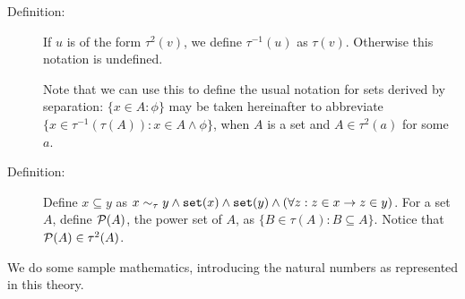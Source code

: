 \documentclass[12pt]{article}
\begin{document}
\begin{description}

\item[Definition:]  If $u$ is of the form $\tau^2(v)$, we define $\tau^{-1}(u)$ as $\tau(v)$.  Otherwise this notation is undefined.

Note that we can use this to define the usual notation for sets derived by separation:  $\{x \in A : \phi\}$
may be taken hereinafter to abbreviate $\{x \in \tau^{-1}(\tau(A)):x \in A \wedge \phi\}$, when $A$ is a set and $A \in \tau^2(a)$ for some $a$.

\item[Definition:]  Define $x \subseteq y$ as $x \sim_\tau y \wedge{\tt set}(x) \wedge {\tt set}(y) \wedge (\forall z:z \in x \rightarrow z \in y)$.  For a set $A$,
define ${\cal P}(A)$, the power set of $A$, as $\{B \in \tau(A):B \subseteq A\}$.  Notice that ${\cal P}(A) \in \tau^2(A)$.

\end{description}

We do some sample mathematics, introducing the natural numbers as represented in this theory.
\end{document}
